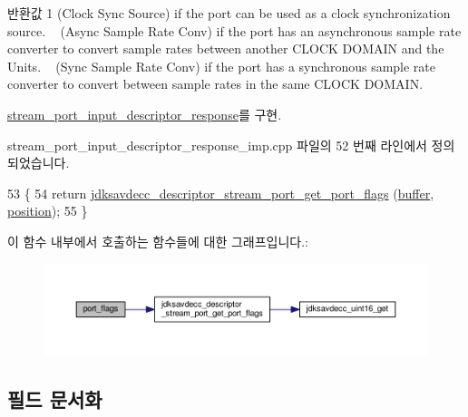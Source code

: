 \begin{DoxyReturn}{반환값}
1 (Clock Sync Source) if the port can be used as a clock synchronization source. ~ (Async Sample Rate Conv) if the port has an asynchronous sample rate converter to convert sample rates between another C\+L\+O\+CK D\+O\+M\+A\+IN and the Unit\textquotesingle{}s. ~ (Sync Sample Rate Conv) if the port has a synchronous sample rate converter to convert between sample rates in the same C\+L\+O\+CK D\+O\+M\+A\+IN. 
\end{DoxyReturn}


\hyperlink{classavdecc__lib_1_1stream__port__input__descriptor__response_a66bad2f1317cba04f0ea271f7181b58f}{stream\+\_\+port\+\_\+input\+\_\+descriptor\+\_\+response}를 구현.



stream\+\_\+port\+\_\+input\+\_\+descriptor\+\_\+response\+\_\+imp.\+cpp 파일의 52 번째 라인에서 정의되었습니다.


\begin{DoxyCode}
53 \{
54     \textcolor{keywordflow}{return} \hyperlink{group__descriptor__stream__port_ga95f34b2f9da40d90ee1b5b7fcda8403f}{jdksavdecc\_descriptor\_stream\_port\_get\_port\_flags}
      (\hyperlink{classavdecc__lib_1_1descriptor__response__base__imp_a56ed84df35de10bdb65e72b184309497}{buffer}, \hyperlink{classavdecc__lib_1_1descriptor__response__base__imp_a7a04afe5347934be732ec70a70bd0a28}{position});
55 \}
\end{DoxyCode}


이 함수 내부에서 호출하는 함수들에 대한 그래프입니다.\+:
\nopagebreak
\begin{figure}[H]
\begin{center}
\leavevmode
\includegraphics[width=350pt]{classavdecc__lib_1_1stream__port__input__descriptor__response__imp_ae5cbe71db539f040ce51a399c2ba66c5_cgraph}
\end{center}
\end{figure}




\subsection{필드 문서화}
